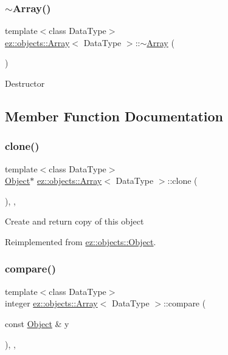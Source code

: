 \subsubsection{\texorpdfstring{$\sim$\+Array()}{~Array()}}
{\footnotesize\ttfamily template$<$class Data\+Type$>$ \\
\hyperlink{classez_1_1objects_1_1Array}{ez\+::objects\+::\+Array}$<$ Data\+Type $>$\+::$\sim$\hyperlink{classez_1_1objects_1_1Array}{Array} (\begin{DoxyParamCaption}{ }\end{DoxyParamCaption})\hspace{0.3cm}{\ttfamily [inline]}}

Destructor 

\subsection{Member Function Documentation}
\mbox{\label{classez_1_1objects_1_1Array_a8618e73b6309573691b1fea690b8213a}} 
\subsubsection{\texorpdfstring{clone()}{clone()}}
{\footnotesize\ttfamily template$<$class Data\+Type$>$ \\
\hyperlink{classez_1_1objects_1_1Object}{Object}$\ast$ \hyperlink{classez_1_1objects_1_1Array}{ez\+::objects\+::\+Array}$<$ Data\+Type $>$\+::clone (\begin{DoxyParamCaption}{ }\end{DoxyParamCaption})\hspace{0.3cm}{\ttfamily [inline]}, {\ttfamily [override]}, {\ttfamily [virtual]}}

Create and return copy of this object 

Reimplemented from \hyperlink{classez_1_1objects_1_1Object_acf444b2581d898eb4b8c92c2d5865c9e}{ez\+::objects\+::\+Object}.

\mbox{\label{classez_1_1objects_1_1Array_ac0d97a024e177f655b2f58981a68fcf8}} 
\subsubsection{\texorpdfstring{compare()}{compare()}}
{\footnotesize\ttfamily template$<$class Data\+Type$>$ \\
integer \hyperlink{classez_1_1objects_1_1Array}{ez\+::objects\+::\+Array}$<$ Data\+Type $>$\+::compare (\begin{DoxyParamCaption}\item[{const \hyperlink{classez_1_1objects_1_1Object}{Object} \&}]{y }\end{DoxyParamCaption})\hspace{0.3cm}{\ttfamily [inline]}, {\ttfamily [override]}, {\ttfamily [virtual]}}

